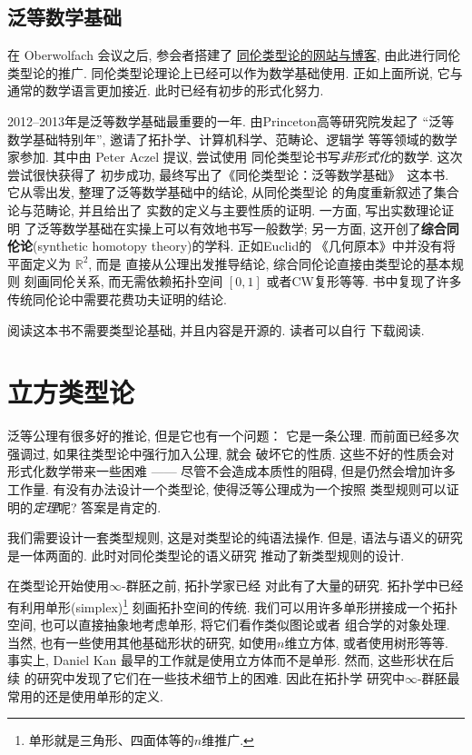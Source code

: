 \documentclass[UTF8]{ctexbook}
\theoremstyle{plain}
\theoremstyle{definition}
\theoremstyle{remark}
\begin{document}
\subsection{泛等数学基础}
在 Oberwolfach 会议之后, 参会者搭建了%
\href{http://homotopytypetheory.org/}{同伦类型论的网站与博客},
由此进行同伦类型论的推广.
同伦类型论理论上已经可以作为数学基础使用. 正如上面所说, 它与
通常的数学语言更加接近. 此时已经有初步的形式化努力.

2012--2013年是泛等数学基础最重要的一年. 由Princeton高等研究院发起了
“泛等数学基础特别年”, 邀请了拓扑学、计算机科学、范畴论、逻辑学
等等领域的数学家参加. 其中由 Peter Aczel 提议, 尝试使用
同伦类型论书写\emph{非形式化}的数学. 这次尝试很快获得了
初步成功, 最终写出了《同伦类型论：泛等数学基础》~\cite{ufp:2013:hottbook}这本书.
它从零出发, 整理了泛等数学基础中的结论, 从同伦类型论
的角度重新叙述了集合论与范畴论, 并且给出了
实数的定义与主要性质的证明. 一方面, 写出实数理论证明
了泛等数学基础在实操上可以有效地书写一般数学; 另一方面,
这开创了\textbf{综合同伦论}(synthetic homotopy theory)的学科. 正如Euclid的
《几何原本》中并没有将平面定义为 \(\mathbb R^2\), 而是
直接从公理出发推导结论, 综合同伦论直接由类型论的基本规则
刻画同伦关系, 而无需依赖拓扑空间 \([0,1]\) 或者CW复形等等.
书中复现了许多传统同伦论中需要花费功夫证明的结论.

阅读这本书不需要类型论基础, 并且内容是开源的. 读者可以自行
下载阅读.

\section{立方类型论}

泛等公理有很多好的推论, 但是它也有一个问题： 它是一条公理.
而前面已经多次强调过, 如果往类型论中强行加入公理, 就会
破坏它的性质. 这些不好的性质会对形式化数学带来一些困难
------ 尽管不会造成本质性的阻碍, 但是仍然会增加许多工作量.
有没有办法设计一个类型论, 使得泛等公理成为一个按照
类型规则可以证明的\emph{定理}呢? 答案是肯定的.

我们需要设计一套类型规则, 这是对类型论的纯语法操作. 但是,
语法与语义的研究是一体两面的. 此时对同伦类型论的语义研究
推动了新类型规则的设计.

在类型论开始使用\(\infty\)-群胚之前, 拓扑学家已经
对此有了大量的研究. 拓扑学中已经有利用单形(simplex)\footnote{单形就是三角形、四面体等的\(n\)维推广.}
刻画拓扑空间的传统. 我们可以用许多单形拼接成一个拓扑空间,
也可以直接抽象地考虑单形, 将它们看作类似图论或者
组合学的对象处理. 当然, 也有一些使用其他基础形状的研究,
如使用\(n\)维立方体, 或者使用树形等等. 事实上, Daniel Kan
最早的工作就是使用立方体而不是单形. 然而, 这些形状在后续
的研究中发现了它们在一些技术细节上的困难. 因此在拓扑学
研究中\(\infty\)-群胚最常用的还是使用单形的定义.
\end{document}
